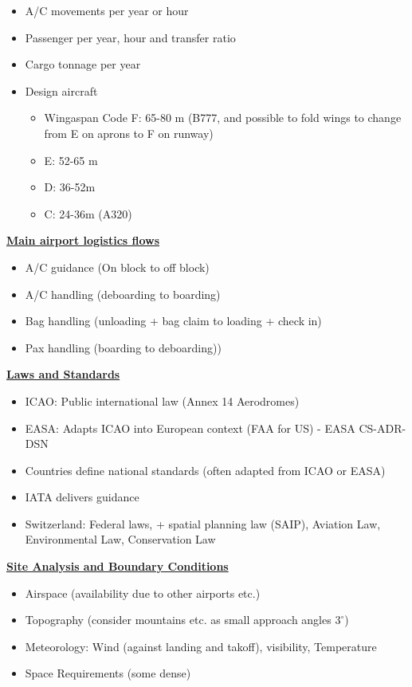 \documentclass[9pt, landscape, fleqn]{scrartcl}
\begin{document}
\begin{multicols*}{3}
\begin{itemize}
    \item A/C movements per year or hour 
    \item Passenger per year, hour and transfer ratio 
    \item Cargo tonnage per year
    \item Design aircraft
    \begin{itemize}
        \item Wingaspan Code F: 65-80 m (B777, and possible to fold wings to change from E on aprons to F on runway)
        \item E: 52-65 m 
        \item D: 36-52m
        \item C: 24-36m (A320)
    \end{itemize}
\end{itemize}
\underline{\textbf{Main airport logistics flows}}
\begin{itemize}
    \item A/C guidance (On block to off block)
    \item A/C handling (deboarding to boarding)
    \item Bag handling (unloading + bag claim to loading + check in)
    \item Pax handling (boarding to deboarding))
\end{itemize}
\underline{\textbf{Laws and Standards}}
\begin{itemize}
    \item ICAO: Public international law (Annex 14 Aerodromes)
    \item EASA: Adapts ICAO into European context (FAA for US) - EASA CS-ADR-DSN
    \item Countries define national standards (often adapted from ICAO or EASA)
    \item IATA delivers guidance 
    \item Switzerland: Federal laws, + spatial planning law (SAIP), Aviation Law, Environmental Law, Conservation Law
\end{itemize}
\underline{\textbf{Site Analysis and Boundary Conditions}}
\begin{itemize}
    \item Airspace (availability due to other airports etc.)
    \item Topography (consider mountains etc. as small approach angles $3^\circ$)
    \item Meteorology: Wind (against landing and takoff), visibility, Temperature 
    \item Space Requirements (some dense)

\end{itemize}
\end{multicols*}
\end{document}

